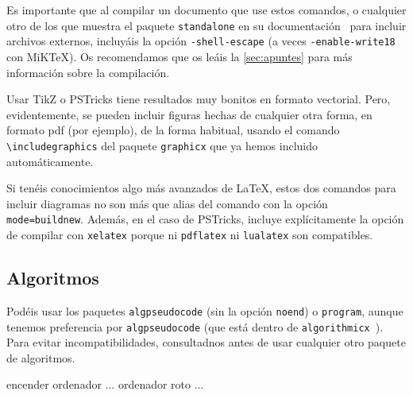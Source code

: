 \documentclass[%
extracommands,%
]{revistaanem}
\begin{document}
Es importante que al compilar un documento que use estos comandos, o cualquier otro de los que muestra el paquete \verb+standalone+ en su documentación~\cite{standalone} para incluir archivos externos, incluyáis la opción \verb+-shell-escape+ (a veces \verb+-enable-write18+ con MiK\TeX).
Os recomendamos que os leáis la \cref{sec:apuntes} para más información sobre la compilación.

Usar TikZ o PSTricks tiene resultados muy bonitos en formato vectorial.
Pero, evidentemente, se pueden incluir figuras hechas de cualquier otra forma, en formato pdf (por ejemplo), de la forma habitual, usando el comando \verb+\includegraphics+ del paquete \verb+graphicx+ que ya hemos incluido automáticamente.

\begin{nota}
Si tenéis conocimientos algo más avanzados de \LaTeX{}, estos dos comandos para incluir diagramas no son más que alias del comando \verb++ con la opción \verb+mode=buildnew+.
Además, en el caso de PSTricks, incluye explícitamente la opción de compilar con \verb+xelatex+ porque ni \verb+pdflatex+ ni \verb+lualatex+ son compatibles.
\end{nota}

\subsection{Algoritmos}
Podéis usar los paquetes \verb+algpseudocode+ (sin la opción \verb+noend+) o \verb+program+, aunque tenemos preferencia por \verb+algpseudocode+ (que está dentro de \verb+algorithmicx+~\cite{algorithmicx}).
Para evitar incompatibilidades, consultadnos antes de usar cualquier otro paquete de algoritmos.

\begin{algoritmo}
\begin{algorithmic}[1]
\State encender ordenador
\State ... 
\Else
\State ordenador roto
\EndIf
\EndIf
\Else
\State ... 
\EndIf
\EndIf
\EndProcedure
\end{algorithmic}
\end{algoritmo}
\end{document}
